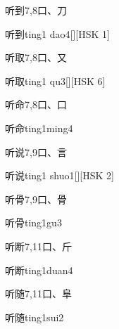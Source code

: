 \begin{Entry}{听到}{7,8}{⼝、⼑}
  \begin{Phonetics}{听到}{ting1 dao4}[][HSK 1]
  \end{Phonetics}
\end{Entry}

\begin{Entry}{听取}{7,8}{⼝、⼜}
  \begin{Phonetics}{听取}{ting1 qu3}[][HSK 6]
  \end{Phonetics}
\end{Entry}

\begin{Entry}{听命}{7,8}{⼝、⼝}
  \begin{Phonetics}{听命}{ting1ming4}
  \end{Phonetics}
\end{Entry}

\begin{Entry}{听说}{7,9}{⼝、⾔}
  \begin{Phonetics}{听说}{ting1 shuo1}[][HSK 2]
  \end{Phonetics}
\end{Entry}

\begin{Entry}{听骨}{7,9}{⼝、⾻}
  \begin{Phonetics}{听骨}{ting1gu3}
  \end{Phonetics}
\end{Entry}

\begin{Entry}{听断}{7,11}{⼝、⽄}
  \begin{Phonetics}{听断}{ting1duan4}
  \end{Phonetics}
\end{Entry}

\begin{Entry}{听随}{7,11}{⼝、⾩}
  \begin{Phonetics}{听随}{ting1sui2}
  \end{Phonetics}
\end{Entry}

